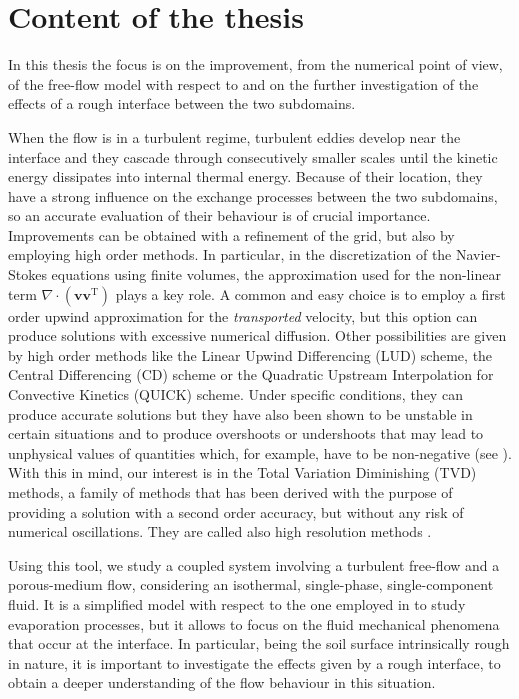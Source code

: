 \section{Content of the thesis}
In this thesis the focus is on the improvement, from the numerical point of view, of the free-flow model with respect to \cite{tesi:fetzer} and on the further investigation of the effects of a rough interface between the two subdomains.

When the flow is in a turbulent regime, turbulent eddies develop near the interface and 
they cascade through consecutively smaller scales until the kinetic energy 
dissipates into internal thermal energy. Because of their location, they have 
a strong influence on the exchange processes between the two subdomains, so an 
accurate evaluation of their behaviour is of crucial importance. Improvements 
can be obtained with a refinement of the grid, but also by employing 
high order methods. In 
particular, in the discretization of the Navier-Stokes equations using finite 
volumes, the approximation used for the non-linear term 
$\nabla \cdot (\mathbf{v} \mathbf{v}^\mathrm{T})$ plays a key role. A common and easy 
choice is to employ a first order upwind approximation for the 
\emph{transported} velocity, but this option can produce solutions with 
excessive numerical diffusion. Other possibilities are given by high order 
methods 
like the Linear Upwind Differencing (LUD) scheme, the Central Differencing (CD) 
scheme or the Quadratic Upstream Interpolation for Convective Kinetics (QUICK) 
scheme. Under specific conditions, they can produce 
accurate solutions but they have also been shown to be unstable in certain 
situations and to produce overshoots or undershoots that 
may lead to unphysical values of quantities which, for example, have to be 
non-negative (see \cite{main:vermal}). With this in mind, our interest is in 
the Total Variation Diminishing (TVD) methods, a family of methods that has 
been derived with the purpose of providing a solution with a second order 
accuracy, but without any risk of numerical oscillations. They are called also 
high resolution methods \cite{tvd:monotonicity}.

Using this tool, we study a coupled system involving a turbulent free-flow and a porous-medium flow, considering an isothermal, single-phase, single-component fluid. It is a simplified model with respect to the one employed in \cite{tesi:fetzer} to study evaporation processes, but it allows to focus on the fluid mechanical phenomena that occur at the interface. In particular, being the soil surface intrinsically rough in nature, it is important to investigate the effects given by a rough interface, to obtain a deeper understanding of the flow behaviour in this situation. 

